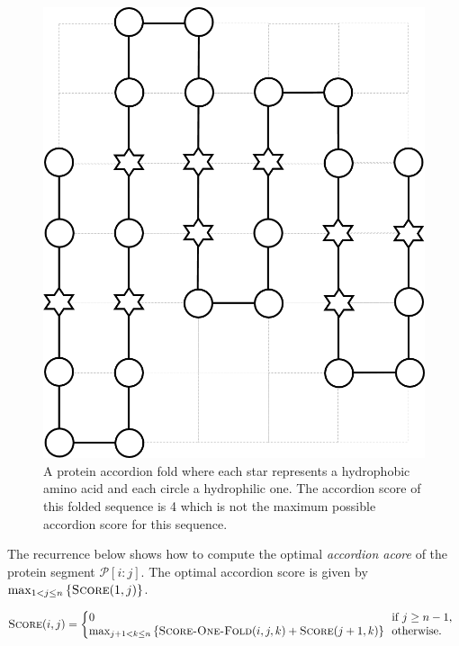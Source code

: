 \documentclass[11pt]{article}
\newcommand{\m}{\mathcal}
\def\func#1{\mbox{\textrm{\bf{\sc{#1}}}}}
\begin{document}
\begin{figure}[h]
	\centering
	\includegraphics[scale=0.35]{protein-accordion-fold.png}
        \vspace{-0.3cm}
	\caption{A protein accordion fold where each star represents a hydrophobic amino acid and each circle a hydrophilic one. 
                 The accordion score of this folded sequence is 4 which is not the maximum possible accordion score for this sequence.}
	\label{fig:fold}
\end{figure}


The recurrence below shows how to compute the optimal {\em accordion acore} of the
protein segment $\m{P}[i:j]$. The optimal accordion score is given by $\max_{1 < j \leq n}{\left\{ \func{Score}(1, j) \right\}}$.

{
 \vspace{-0.2cm}
 \begin{eqnarray*}
\label{eq:score}
 \func{Score}( i, j ) = \left\{ \begin{array}{@{}l@{~}l}
                   0 & \textrm{if $j \geq n - 1$,}\\
                   \max_{j + 1 < k \leq n}{\left\{ \func{Score-One-Fold}( i, j, k ) + \func{Score}(j + 1, k) \right\} }~
                     & \textrm{otherwise}.
                   \end{array} \right.
 \end{eqnarray*}
}
\end{document}
